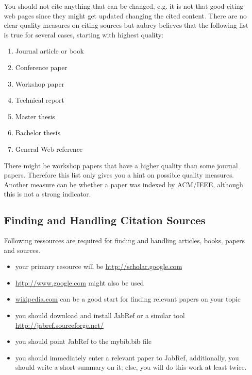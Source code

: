 You should not cite anything that can be changed, e.g. it is not that good citing web pages since they might get updated changing the cited content. There are no clear quality measures on citing sources but aubrey believes that the following list is true for several cases, starting with highest quality:
\begin{enumerate}
\item Journal article or book
\item Conference paper
\item Workshop paper
\item Technical report
\item Master thesis
\item Bachelor thesis
\item General Web reference
\end{enumerate}
There might be workshop papers that have a higher quality than some journal papers. Therefore this list only gives you a hint on possible quality measures. Another measure can be whether a paper was indexed by ACM/IEEE, although this is not a strong indicator.

\subsection*{Finding and Handling Citation Sources}
Following ressources are required for finding and handling articles, books, papers and sources.
\begin{itemize}
\item your primary resource will be \url{http://scholar.google.com}
\item \url{http://www.google.com} might also be used
\item \url{wikipedia.com} can be a good start for finding relevant papers on your topic
\item you should download and install JabRef or a similar tool \url{http://jabref.sourceforge.net/}
\item you should point JabRef to the mybib.bib file
\item you should immediately enter a relevant paper to JabRef, additionally, you should write a short summary on it; else, you will do this work at least twice.
\end{itemize}

